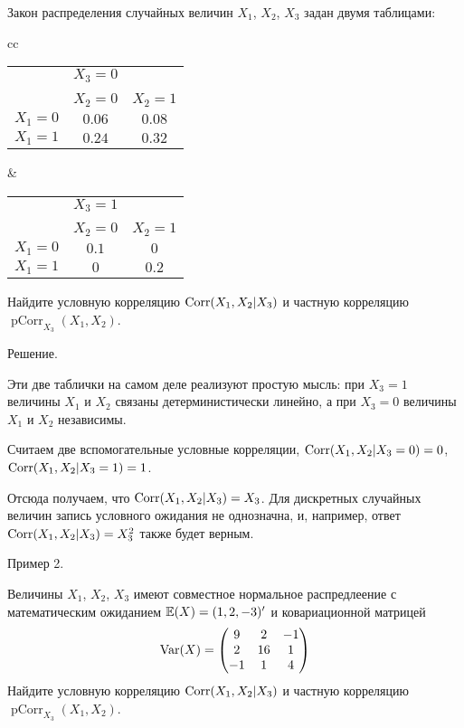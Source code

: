 \documentclass[10pt]{article}
\DeclareMathOperator{\pCorr}{pCorr}
\begin{document}
Закон распределения случайных величин $X_1$, $X_2$, $X_3$ задан двумя таблицами:

\begin{center}
\begin{tabular}{cc}
\begin{tabular}{ccc}
& $X_3=0$ &    \\
& & \\
\cline{1-3}
 & $X_2=0$ & $X_2=1$ \\
\cline{1-3}
$X_1=0$ & $0.06$ & $0.08$ \\
$X_1=1$ & $0.24$ & $0.32$  \\
\end{tabular}
&
\begin{tabular}{ccc}
& $X_3=1$ &    \\
& & \\
\cline{1-3}
 & $X_2=0$ & $X_2=1$ \\
\cline{1-3}
$X_1=0$ & $0.1$ & $0$ \\
$X_1=1$ & $0$ & $0.2$ \\
\end{tabular}
\end{tabular}
\end{center}

Найдите условную корреляцию $\operatorname{Corr}(X_1,X_2|X_3)$ и частную корреляцию $\pCorr_{X_3}(X_1,X_2)$.

Решение.

Эти две таблички на самом деле реализуют простую мысль: при $X_3=1$ величины $X_1$ и $X_2$  связаны детерминистически линейно, а при $X_3=0$ величины $X_1$ и $X_2$ независимы.

Считаем две вспомогательные условные корреляции, $\operatorname{Corr}(X_1,X_2|X_3=0)=0$, $\operatorname{Corr}(X_1,X_2|X_3=1)=1$.

Отсюда получаем, что $\operatorname{Corr}(X_1,X_2|X_3)=X_3$. Для дискретных случайных величин запись условного ожидания не однозначна, и, например, ответ $\operatorname{Corr}(X_1,X_2|X_3)=X_3^2$ также будет верным.



Пример 2.

Величины $X_1$, $X_2$, $X_3$ имеют совместное нормальное распредлеение с математическим ожиданием $\mathbb{E}(X)=(1,2,-3)'$ и ковариационной матрицей 
\[
\operatorname{Var}(X)=\begin{pmatrix}
9 & 2 & -1 \\
2 & 16 & 1 \\
-1 & 1 & 4 
\end{pmatrix}
\]
Найдите условную корреляцию $\operatorname{Corr}(X_1,X_2|X_3)$ и частную корреляцию $\pCorr_{X_3}(X_1,X_2)$.
\end{document}
